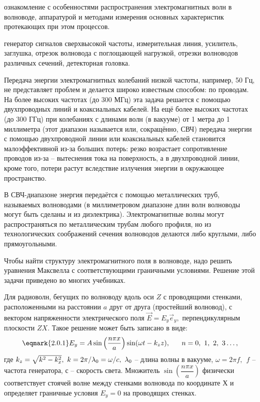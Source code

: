 \begin{lab:aim}
ознакомление с особенностями распространения электромагнитных волн в волноводе, аппаратурой и методами измерения основных характеристик протекающих при этом процессов.
\end{lab:aim}

\begin{lab:equipment}
генератор сигналов сверхвысокой частоты, измерительная линия, усилитель, заглушка, отрезок волновода с поглощающей нагрузкой, отрезки волноводов различных сечений, детекторная головка.
\end{lab:equipment}

Передача энергии электромагнитных колебаний низкой частоты, например, 50 Гц, не представляет проблем и делается широко известным способом: по проводам. На более высоких частотах (до 300 МГц) эта задача решается с помощью двухпроводных линий и коаксиальных кабелей. На ещё более высоких частотах (до 300 ГГц) при колебаниях с длинами волн (в вакууме) от 1 метра до 1 миллиметра (этот диапазон называется  или, сокращённо, СВЧ) передача энергии с помощью двухпроводной линии или коаксиальных кабелей становится малоэффективной из-за больших потерь: резко возрастает сопротивление проводов из-за  – вытеснения тока на поверхность, а в двухпроводной линии, кроме того, потери растут вследствие излучения энергии в окружающее пространство.

В СВЧ-диапазоне энергия передаётся с помощью металлических труб, называемых волноводами (в миллиметровом диапазоне длин волн волноводы могут быть сделаны и из диэлектрика). Электромагнитные волны могут распространяться по металлическим трубам любого профиля, но из технологических соображений сечения волноводов делаются либо круглыми, либо прямоугольными.

Чтобы найти структуру электромагнитного поля в волноводе, надо решить уравнения Максвелла с соответствующими граничными условиями. Решение этой задачи приведено во многих учебниках.

Для радиоволн, бегущих по волноводу вдоль оси $Z$ с проводящими стенками, расположенными на расстоянии $a$ друг от друга (простейший волновод), с вектором напряженности электрического поля $\vec E=E_y \vec e_y,$ перпендикулярным плоскости $ZX$. Такое решение может быть записано в виде:
\begin{equation}
	\eqmark{2.0.1}
	E_y=A\sin\left(\dfrac{n\pi x}{a}\right)\sin(\omega t-k_zz),~~~~~n=0,~1,~2,~3 \ldots,
\end{equation}
где $k_z=\sqrt{k^2-k^2_x},~k=2\pi/\lambda_{\sc{0}}=\omega/c,~\lambda_{\sc{0}}$ – длина волны в вакууме, $\omega=2\pi f,~~f$ – частота генератора, $с$ – скорость света. Множитель $\sin\left(\dfrac{n\pi x}{a}\right)$ физически соответствует стоячей волне между стенками волновода по координате $Х$ и определяет граничные условия $E_y=0$ на проводящих стенках.
	
